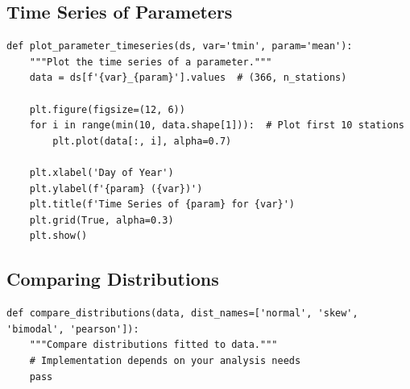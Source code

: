 ﻿\documentclass[12pt,a4paper]{report}
\begin{document}
\subsection{Time Series of Parameters}
\begin{lstlisting}[caption=Time Series of Parameters]
def plot_parameter_timeseries(ds, var='tmin', param='mean'):
    """Plot the time series of a parameter."""
    data = ds[f'{var}_{param}'].values  # (366, n_stations)

    plt.figure(figsize=(12, 6))
    for i in range(min(10, data.shape[1])):  # Plot first 10 stations
        plt.plot(data[:, i], alpha=0.7)

    plt.xlabel('Day of Year')
    plt.ylabel(f'{param} ({var})')
    plt.title(f'Time Series of {param} for {var}')
    plt.grid(True, alpha=0.3)
    plt.show()
\end{lstlisting}

\subsection{Comparing Distributions}
\begin{lstlisting}[caption=Comparing Distributions]
def compare_distributions(data, dist_names=['normal', 'skew', 'bimodal', 'pearson']):
    """Compare distributions fitted to data."""
    # Implementation depends on your analysis needs
    pass
\end{lstlisting}
\end{document}
